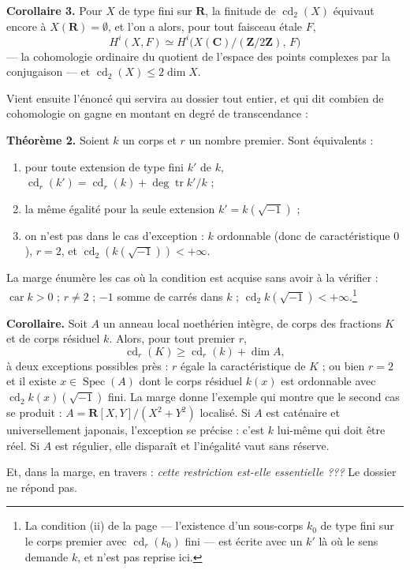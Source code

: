 \documentclass[11pt,a4paper]{article}
\begin{document}
\textbf{Corollaire 3.} Pour $X$ de type fini sur $\mathbf{R}$, la finitude de
$\operatorname{cd}_2(X)$ équivaut encore à $X(\mathbf{R}) = \emptyset$, et l'on
a alors, pour tout faisceau étale $F$,
\[
H^i(X,F) \simeq H^i\bigl(X(\mathbf{C})/(\mathbf{Z}/2\mathbf{Z}),\, F\bigr)
\]
— la cohomologie ordinaire du quotient de l'espace des points complexes par la
conjugaison — et $\operatorname{cd}_2(X) \leqslant 2\dim X$.

Vient ensuite l'énoncé qui servira au dossier tout entier, et qui dit combien
de cohomologie on gagne en montant en degré de transcendance :

\textbf{Théorème 2.} Soient $k$ un corps et $r$ un nombre premier. Sont
équivalents :
\begin{enumerate}
\item[(i)] pour toute extension de type fini $k'$ de $k$,
$\operatorname{cd}_r(k') = \operatorname{cd}_r(k) + \deg\operatorname{tr}
k'/k$ ;
\item[(i bis)] la même égalité pour la seule extension
$k' = k(\sqrt{-1})$ ;
\item[(iii)] on n'est pas dans le cas d'exception : $k$ ordonnable (donc de
caractéristique $0$), $r = 2$, et $\operatorname{cd}_2(k(\sqrt{-1})) <
+\infty$.
\end{enumerate}
La marge énumère les cas où la condition est acquise sans avoir à la vérifier :
$\operatorname{car} k > 0$ ; $r \neq 2$ ; $-1$ somme de carrés dans $k$ ;
$\operatorname{cd}_2 k(\sqrt{-1}) < +\infty$.\footnote{La condition (ii) de la
page — l'existence d'un sous-corps $k_0$ de type fini sur le corps premier avec
$\operatorname{cd}_r(k_0)$ fini — est écrite avec un $k'$ là où le sens demande
$k$, et n'est pas reprise ici.}

\textbf{Corollaire.} Soit $A$ un anneau local noethérien intègre, de corps des
fractions $K$ et de corps résiduel $k$. Alors, pour tout premier $r$,
\[
\operatorname{cd}_r(K) \geqslant \operatorname{cd}_r(k) + \dim A,
\]
à deux exceptions possibles près : $r$ égale la caractéristique de $K$ ; ou
bien $r = 2$ et il existe $x \in \operatorname{Spec}(A)$ dont le corps résiduel
$k(x)$ est ordonnable avec $\operatorname{cd}_2 k(x)(\sqrt{-1})$ fini. La marge
donne l'exemple qui montre que le second cas se produit :
$A = \mathbf{R}[X,Y]/(X^2+Y^2)$ localisé. Si $A$ est caténaire et
universellement japonais, l'exception se précise : c'est $k$ lui-même qui doit
être réel. Si $A$ est régulier, elle disparaît et l'inégalité vaut sans
réserve.

Et, dans la marge, en travers : \emph{cette restriction est-elle essentielle
???} Le dossier ne répond pas.
\end{document}
